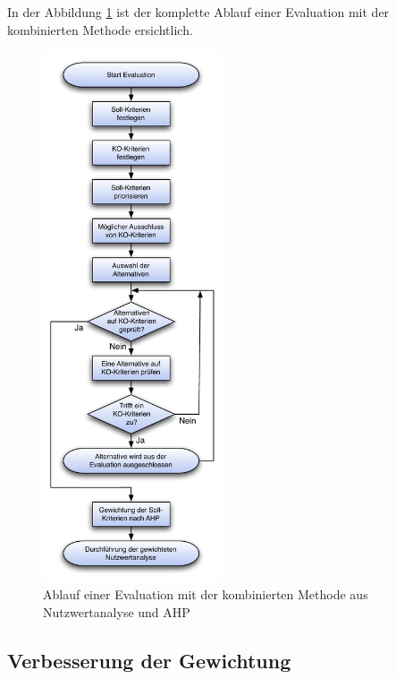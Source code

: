   In der Abbildung \ref{img:ablaufEvaluation} ist der komplette Ablauf einer
  Evaluation mit der kombinierten Methode ersichtlich.
    
  \begin{figure}[ht]
    \begin{center}
      \includegraphics[width=0.47\textwidth]{./image/ablaufEvaluation.pdf}
      \caption{Ablauf einer Evaluation mit der kombinierten Methode aus
      Nutzwertanalyse und \ac{AHP}}
      \label{img:ablaufEvaluation}
    \end{center}
  \end{figure}
  
  \subsection{Verbesserung der 
  Gewichtung}\label{subsection:VerbesserungDerGewichtung}
  
